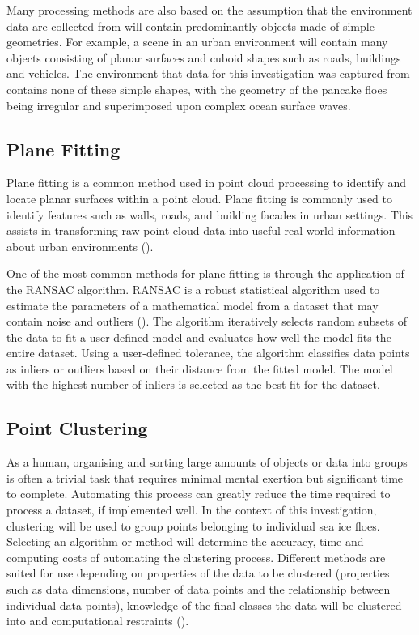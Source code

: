 Many processing methods are also based on the assumption that the environment data are collected from will contain predominantly objects made of simple geometries. For example, a scene in an urban environment will contain many objects consisting of planar surfaces and cuboid shapes such as roads, buildings and vehicles. The environment that data for this investigation was captured from contains none of these simple shapes, with the geometry of the pancake floes being irregular and superimposed upon complex ocean surface waves.

\subsection{Plane Fitting}
\label{subsec:ch3.section3.subsec1}

Plane fitting is a common method used in point cloud processing to identify and locate planar surfaces within a point cloud. Plane fitting is commonly used to identify features such as walls, roads, and building facades in urban settings. This assists in transforming raw point cloud data into useful real-world information about urban environments (\cite{lohaniAirborneLiDARTechnology2017}).

One of the most common methods for plane fitting is through the application of the \ac{RANSAC} algorithm. \ac{RANSAC} is a robust statistical algorithm used to estimate the parameters of a mathematical model from a dataset that may contain noise and outliers (\cite{fischlerRandomSampleConsensus1981}). The algorithm iteratively selects random subsets of the data to fit a user-defined model and evaluates how well the model fits the entire dataset. Using a user-defined tolerance, the algorithm classifies data points as inliers or outliers based on their distance from the fitted model. The model with the highest number of inliers is selected as the best fit for the dataset.

\subsection{Point Clustering}
\label{subsec:ch3.section3.subsec2}

As a human, organising and sorting large amounts of objects or data into groups is often a trivial task that requires minimal mental exertion but significant time to complete. Automating this process can greatly reduce the time required to process a dataset, if implemented well. In the context of this investigation, clustering will be used to group points belonging to individual sea ice floes.  Selecting an algorithm or method will determine the accuracy, time and computing costs of automating the clustering process. Different methods are suited for use depending on properties of the data to be clustered (properties such as data dimensions, number of data points and the relationship between individual data points), knowledge of the final classes the data will be clustered into and computational restraints (\cite{xuComprehensiveSurveyClustering2015}).


